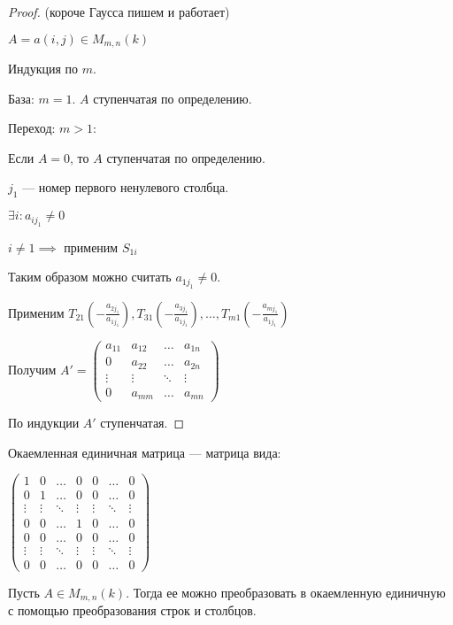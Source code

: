 \begin{proof} (короче Гаусса пишем и работает)

    $A = a(i, j) \in M_{m, n}(k)$

    Индукция по $m$.

    База: $m = 1$. $A$ ступенчатая по определению.

    Переход: $m > 1$:

    Если $A = 0$, то $A$ ступенчатая по определению.

    $j_1$ --- номер первого ненулевого столбца. 

    $\exists i : a_{ij_1} \neq 0$

    $i \neq 1 \implies$ применим $S_{1i}$

    Таким образом можно считать $a_{1j_1} \neq 0$.

    Применим $T_{21} \left( -\frac{a_{2j_1}}{a_{1j_1}} \right), T_{31} \left( -\frac{a_{3j_1}}{a_{1j_1}} \right), \ldots, T_{m1} \left( -\frac{a_{mj_1}}{a_{1j_1}} \right)$

    Получим $A' = \begin{pmatrix} a_{11} & a_{12} & \ldots & a_{1n} \\ 0 & a_{22} & \ldots & a_{2n} \\ \vdots & \vdots & \ddots & \vdots \\ 0 & a_{mm} & \ldots & a_{mn} \end{pmatrix}$

    По индукции $A'$ ступенчатая.
\end{proof}

\begin{defn}
    Окаемленная единичная матрица --- матрица вида:

    $\begin{pmatrix}
        1 & 0 & \ldots & 0 & 0 & \ldots & 0 \\
        0 & 1 & \ldots & 0 & 0 & \ldots & 0 \\
        \vdots & \vdots & \ddots & \vdots & \vdots & \ddots & \vdots \\
        0 & 0 & \ldots & 1 & 0 & \ldots & 0 \\
        0 & 0 & \ldots & 0 & 0 & \ldots & 0 \\
        \vdots & \vdots & \ddots & \vdots & \vdots & \ddots & \vdots \\
        0 & 0 & \ldots & 0 & 0 & \ldots & 0
    \end{pmatrix}$
\end{defn}

\begin{theorem}
    Пусть $A \in M_{m, n}(k)$. Тогда ее можно преобразовать в окаемленную единичную с помощью преобразования строк и столбцов.
\end{theorem}

